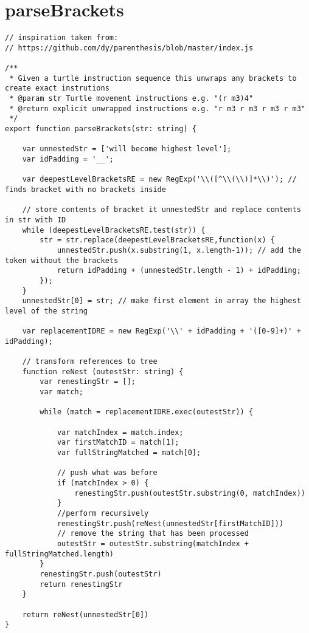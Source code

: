 \documentclass[12pt,a4paper,anyside,openright]{report}
\begin{document}
\section{parseBrackets}
\label{appendix:parseBrackets}
\begin{lstlisting}[style=js]
// inspiration taken from:
// https://github.com/dy/parenthesis/blob/master/index.js

/**
 * Given a turtle instruction sequence this unwraps any brackets to create exact instrutions
 * @param str Turtle movement instructions e.g. "(r m3)4"
 * @return explicit unwrapped instructions e.g. "r m3 r m3 r m3 r m3"
 */
export function parseBrackets(str: string) {

	var unnestedStr = ['will become highest level'];
	var idPadding = '__';

	var deepestLevelBracketsRE = new RegExp('\\([^\\(\\)]*\\)'); // finds bracket with no brackets inside

	// store contents of bracket it unnestedStr and replace contents in str with ID
	while (deepestLevelBracketsRE.test(str)) {
		str = str.replace(deepestLevelBracketsRE,function(x) {
			unnestedStr.push(x.substring(1, x.length-1)); // add the token without the brackets
			return idPadding + (unnestedStr.length - 1) + idPadding;
		});
	}
	unnestedStr[0] = str; // make first element in array the highest level of the string

	var replacementIDRE = new RegExp('\\' + idPadding + '([0-9]+)' + idPadding);

	// transform references to tree
	function reNest (outestStr: string) {
		var renestingStr = [];
		var match;

		while (match = replacementIDRE.exec(outestStr)) {

			var matchIndex = match.index;
			var firstMatchID = match[1];
			var fullStringMatched = match[0];

			// push what was before
			if (matchIndex > 0) {
				renestingStr.push(outestStr.substring(0, matchIndex))
			}
			//perform recursively
			renestingStr.push(reNest(unnestedStr[firstMatchID]))
			// remove the string that has been processed
			outestStr = outestStr.substring(matchIndex + fullStringMatched.length)
		}
		renestingStr.push(outestStr)
		return renestingStr
	}

	return reNest(unnestedStr[0])
}
\end{lstlisting}
\end{document}
